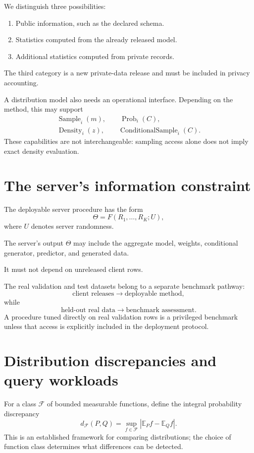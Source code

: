 \documentclass[11pt,a4paper]{article}
\begin{document}
We distinguish three possibilities:
\begin{enumerate}
\item Public information, such as the declared schema.
\item Statistics computed from the already released model.
\item Additional statistics computed from private records.
\end{enumerate}
The third category is a new private-data release and must be included in privacy accounting.

A distribution model also needs an operational interface. Depending on the method, this may support
\[
\begin{gathered}
\operatorname{Sample}_i(m),\qquad\operatorname{Prob}_i(C),\\
\operatorname{Density}_i(z),\qquad\operatorname{ConditionalSample}_i(C).
\end{gathered}
\]
These capabilities are not interchangeable: sampling access alone does not imply exact density evaluation.

\section{The server's information constraint}
The deployable server procedure has the form
\[
\boxed{\Theta=F(R_1,\ldots,R_K;U),}
\]
where $U$ denotes server randomness.

The server's output $\Theta$ may include the aggregate model, weights, conditional generator, predictor, and generated data.

It must not depend on unreleased client rows.

The real validation and test datasets belong to a separate benchmark pathway:
\[
\text{client releases}\longrightarrow\text{deployable method},
\]
while
\[
\text{held-out real data}\longrightarrow\text{benchmark assessment}.
\]
A procedure tuned directly on real validation rows is a privileged benchmark unless that access is explicitly included in the deployment protocol.

\section{Distribution discrepancies and query workloads}
For a class $\mathcal F$ of bounded measurable functions, define the integral probability discrepancy
\[
d_{\mathcal F}(P,Q)=\sup_{f\in\mathcal F}
\left|\mathbb E_Pf-\mathbb E_Qf\right|.
\]
This is an established framework for comparing distributions; the choice of function class determines what differences can be detected.\cite{ipm}
\end{document}
